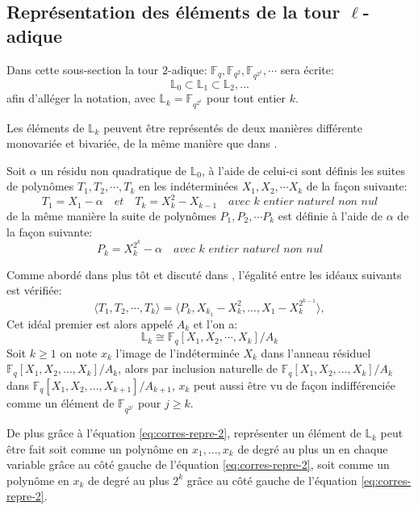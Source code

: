 \documentclass[10pt,a4paper]{book}
\theoremstyle{plain}
\theoremstyle{definition}
\theoremstyle{definition}
\theoremstyle{definition}
\theoremstyle{definition}
\theoremstyle{remark}
\theoremstyle{remark}
\begin{document}
\subsection{Représentation des éléments de la tour $\ell$-adique}%
Dans cette sous-section la tour $2$-adique: $\mathbb{F}_q, \mathbb{F}_{q^2}, \mathbb{F}_{q^{2^2}}, \cdots$ sera écrite:
\[
\mathbb{L}_{0} \subset \mathbb{L}_{1} \subset \mathbb{L}_{2}, ... 
\]
afin d'alléger la notation, avec $\mathbb{L}_{k}=\mathbb{F}_{q^{2^{k}}}$ pour tout entier $k$.


Les éléments de $\mathbb{L}_k$ peuvent être représentés de deux manières différente monovariée et bivariée, de la même manière que dans \cite{DeFeo-Shost'12}. 

Soit $\alpha$ un résidu non quadratique de $ \mathbb{L}_0$, à l'aide de celui-ci sont définis les suites de polynômes $T_1,T_2,\cdots, T_k$ en les indéterminées $X_1,X_2, \cdots X_k$ de la façon suivante:
\[
T_1=X_1-\alpha \quad \textit{et} \quad T_k=X_k^2-X_{k-1} \quad \textit{avec $k$ entier naturel non nul}
\]  de la même manière la suite de polynômes $P_1,P_2, \cdots P_k$ est définie à l'aide de $\alpha$ de la façon suivante:
\[
P_k=X_k^{2^k}-\alpha \quad \textit{avec $k$ entier naturel non nul} 
\]

Comme abordé dans plus tôt et discuté dans \cite{lang2002algebra}, l'égalité entre les idéaux suivants est vérifiée:
\begin{equation}
\label{eq:corres-repre-2}
\langle T_1, T_2, \cdots, T_k \rangle = \langle P_k, X_{k_1}-X_k^2, ..., X_1-X_{k}^{2^{k-1}} \rangle,
\end{equation}
Cet idéal premier est alors appelé $A_k$ et l'on a:
\[
\mathbb{L}_k \cong \mathbb{F}_q[X_1,X_2,\cdots,X_k]/A_k
\]
Soit $k \geqslant 1$  on note $x_k$ l'image de l'indéterminée $X_k$ dans l'anneau résiduel $\mathbb{F}_q[X_1,X_2, ...,X_k]/A_k$, alors par inclusion naturelle de $\mathbb{F}_q[X_1,X_2, ...,X_k]/A_k$ dans $\mathbb{F}_q[X_1,X_2, ...,X_{k+1}]/A_{k+1}$, $x_k$ peut aussi être vu de façon indifférenciée comme un élément de $\mathbb{F}_{q^{2^j}}$ pour $j \geqslant k$.

De plus grâce à l'équation \ref{eq:corres-repre-2}, représenter un élément de $\mathbb{L}_k$ peut être fait soit comme un polynôme en $x_1, ..., x_k$ de degré au plus un en chaque variable grâce au côté gauche de l'équation \ref{eq:corres-repre-2}, soit comme un polynôme en $x_k$ de degré au plus $2^k$ grâce au côté gauche de l'équation \ref{eq:corres-repre-2}.
\end{document}
